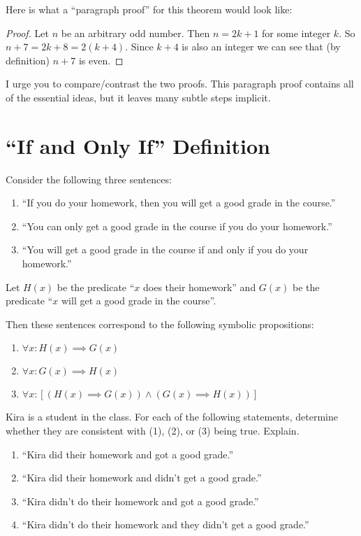 \begin{example}
Here is what a ``paragraph proof'' for this theorem would look like:

\begin{proof}
Let $n$ be an arbitrary odd number.  Then $n=2k+1$ for some integer $k$.  So $n+7 = 2k+8 = 2(k+4)$.  Since $k+4$ is also an integer we can see that (by definition) $n+7$ is even.
\end{proof}

I urge you to compare/contrast the two proofs.  This paragraph proof contains all of the essential ideas, but it leaves many subtle steps implicit.
\end{example}

\section{``If and Only If'' Definition}

Consider the following three sentences:

\begin{enumerate}
	
	\item ``If you do your homework, then you will get a good grade in the course.''
	
	\item  ``You can only get a good grade in the course if you do your homework.''
	
	\item ``You will get a good grade in the course if and only if you do your homework.''
	
\end{enumerate}

Let $H(x)$ be the predicate ``$x$ does their homework'' and $G(x)$ be the predicate ``$x$ will get a good grade in the course''.

Then these sentences correspond to the following symbolic propositions:

\begin{enumerate}
	\item $\forall x: H(x) \implies G(x)$
	\item $\forall x: G(x) \implies H(x)$
	\item $\forall x: [(H(x) \implies G(x)) \wedge (G(x) \implies H(x))]$
\end{enumerate}

\begin{xca}
	Kira is a student in the class.  For each of the following statements, determine whether they are consistent with (1), (2), or (3) being true.  Explain.
	
	\begin{enumerate}
		\renewcommand{\theenumi}{\alph{enumi}}
		\item ``Kira did their homework and got a good grade.''
		\item ``Kira did their homework and didn't get a good grade.''
		\item ``Kira didn't do their homework and got a good grade.''
		\item ``Kira didn't do their homework and they didn't get a good grade.''
	\end{enumerate}
\end{xca}


